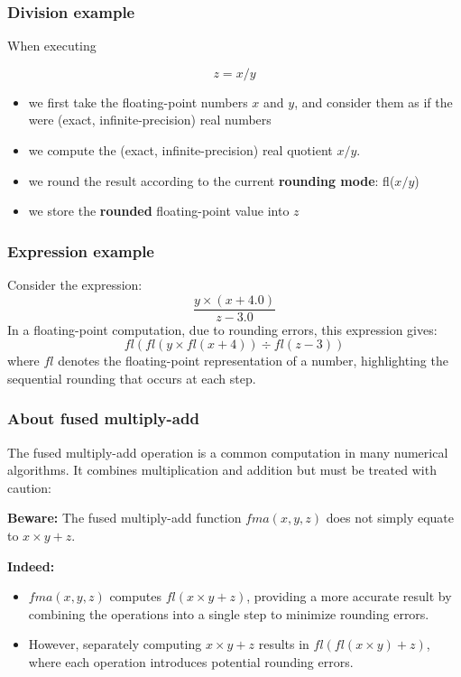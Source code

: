 \documentclass[12pt]{article}
\begin{document}
\subsubsection{Division example}

When executing

\[ z = x / y \]

\begin{itemize}
  \item we first take the floating-point numbers $x$ and $y$, and consider them as if the were (exact, infinite-precision) real numbers
  \item we compute the (exact, infinite-precision) real quotient $x / y$.
  \item we round the result according to the current \textbf{rounding mode}: fl($x / y$)
  \item we store the \textbf{rounded} floating-point value into $z$
\end{itemize}




\subsubsection{Expression example}
Consider the expression:
\[
\frac{y \times (x + 4.0)}{z - 3.0}
\]
In a floating-point computation, due to rounding errors, this expression gives:
\[
fl\left( fl(y \times fl(x + 4)) \div fl(z - 3) \right)
\]
where \( fl \) denotes the floating-point representation of a number, highlighting the sequential rounding that occurs at each step.

\subsubsection{About fused multiply-add}
The fused multiply-add operation is a common computation in many numerical algorithms. It combines multiplication and addition but must be treated with caution:

\textbf{Beware:} The fused multiply-add function \( fma(x, y, z) \) does not simply equate to \( x \times y + z \).

\textbf{Indeed:}
\begin{itemize}
    \item \( fma(x, y, z) \) computes \( fl(x \times y + z) \), providing a more accurate result by combining the operations into a single step to minimize rounding errors.
    \item However, separately computing \( x \times y + z \) results in \( fl(fl(x \times y) + z) \), where each operation introduces potential rounding errors.
\end{itemize}
\end{document}
